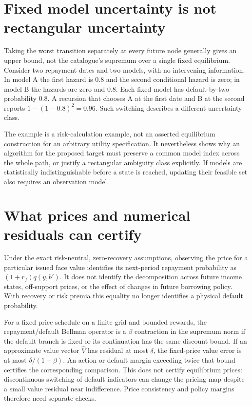 \documentclass[11pt]{article}
\begin{document}
\section*{Fixed model uncertainty is not rectangular uncertainty}
Taking the worst transition separately at every future node generally gives an upper bound, not the catalogue's supremum over a single fixed equilibrium. Consider two repayment dates and two models, with no intervening information. In model A the first hazard is $0.8$ and the second conditional hazard is zero; in model B the hazards are zero and $0.8$. Each fixed model has default-by-two probability $0.8$. A recursion that chooses A at the first date and B at the second reports $1-(1-0.8)^2=0.96$. Such switching describes a different uncertainty class.

The example is a risk-calculation example, not an asserted equilibrium construction for an arbitrary utility specification. It nevertheless shows why an algorithm for the proposed target must preserve a common model index across the whole path, or justify a rectangular ambiguity class explicitly. If models are statistically indistinguishable before a state is reached, updating their feasible set also requires an observation model.

\section*{What prices and numerical residuals can certify}
Under the exact risk-neutral, zero-recovery assumptions, observing the price for a particular issued face value identifies its next-period repayment probability as $(1+r_f)q(y,b')$. It does not identify the decomposition across future income states, off-support prices, or the effect of changes in future borrowing policy. With recovery or risk premia this equality no longer identifies a physical default probability.

For a fixed price schedule on a finite grid and bounded rewards, the repayment/default Bellman operator is a $\beta$ contraction in the supremum norm if the default branch is fixed or its continuation has the same discount bound. If an approximate value vector $\widehat V$ has residual at most $\delta$, the fixed-price value error is at most $\delta/(1-\beta)$. An action or default margin exceeding twice that bound certifies the corresponding comparison. This does not certify equilibrium prices: discontinuous switching of default indicators can change the pricing map despite a small value residual near indifference. Price consistency and policy margins therefore need separate checks.
\end{document}
